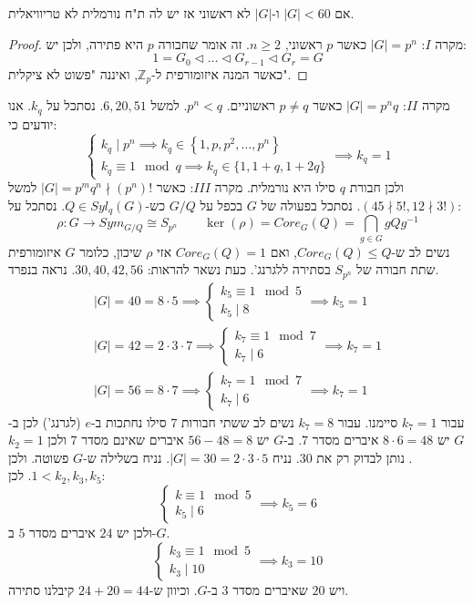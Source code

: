 \documentclass{tstextbook}
\begin{document}
\begin{proposition}
אם \(|G|<60\) ו-\(|G|\) לא ראשוני אז יש לה ת"ח נורמלית לא טריוויאלית.

\end{proposition}
\begin{proof}
מקרה \(I\): \(|G|=p^n\) כאשר \(p\) ראשוני, \(n\geq 2\). זה אומר שחבורה \(p\) היא פתירה, ולכן יש:
$$1=G_{0}\triangleleft \dots \triangleleft G_{r-1}\triangleleft G_{r}=G$$
כאשר המנה איזומורפית ל-\(\mathbb{Z} _p\), ואיננה "פשוט לא ציקלית".

\end{proof}
מקרה \(II\): \(|G|=p^nq\) כאשר \(p\neq q\) ראשוניים. \(p^n<q\). למשל \(6,20,51\). נסתכל על \(k_{q}\). אנו יודעים כי: 
$$\begin{cases}k_{q}\mid p^n\implies k_{q}\in \left\{  1,p,p^2,\dots,p^n  \right\} \\k_{q}\equiv 1\mod q \implies k_{q}\in \{1, 1+q, 1+2q  \}
\end{cases}\implies k_{q}=1$$
ולכן חבורת \(q\) סילו היא נורמלית.
מקרה \(III\): כאשר \(|G|=p^mq^n \nmid(p^n)!\) למשל \(\left( 45\nmid 5!, 12\nmid 3! \right)\). נסתכל בפעולה של \(G\) בכפל על \(G / Q\) כש-\(Q\in Syl_{q}(G)\). נסתכל על:
$$\rho:G\to Sym_{G / Q}\cong S_{p^n}\qquad \ker\left( \rho \right)=Core_{G}(Q)=\bigcap_{g\in G}gQg^{-1}$$
נשים לב ש-\(Core_{G}(Q)\leq Q\), ואם \(Core_{G}(Q)=1\) אזי \(\rho\) שיכון, כלומר \(G\) איזומורפית שתת חבורה של \(S_{p^n}\) בסתירה ללגרנג'.
כעת נשאר להראות: \(30,40,42,56\). נראה בנפרד.
$$\begin{gather}|G|=40=8\cdot 5\implies \begin{cases}k_{5}\equiv 1 \mod 5\\k_{5}\mid 8\end{cases}\implies k_{5}=1\\|G|=42=2\cdot 3\cdot 7\implies \begin{cases}k_{7} \equiv 1 \mod 7 \\k_{7} \mid 6\end{cases}\implies k_{7}=1\\|G|=56=8\cdot 7\implies \begin{cases}k_{7}=1 \mod 7 \\k_{7} \mid 6\end{cases}\implies k_{7}=1 
\end{gather}$$
עבור \(k_{7}=1\) סיימנו. עבור \(k_{7}=8\) נשים לב ששתי חבורות \(7\) סילו נחתכות ב-\(e\) (לגרנג') לכן ב-\(G\) יש \(8\cdot 6=48\) איברים מסדר \(7\). ב-\(G\) יש \(56-48=8\) איברים שאינם מסדר \(7\) ולכן \(k_{2}=1\). נותן לבדוק רק את \(30\). נניח \(|G|=30=2\cdot 3\cdot 5\). נניח בשלילה ש-\(G\) פשוטה. ולכן \(1<k_{2},k_{3},k_{5}\). לכן: 
$$\begin{cases}k \equiv 1 \mod 5 \\k_{5} \mid 6
\end{cases}\implies k_{5}=6$$
ולכן יש \(24\) איברים מסדר \(5\) ב-\(G\).
$$\begin{cases}  k_{3} \equiv 1 \mod 5\\k_{3}\mid 10  
\end{cases}\implies k_{3}=10$$
ויש \(20\) שאיברים מסדר \(3\) ב-\(G\). וכיוון ש-\(24+20=44\) קיבלנו סתירה.
\end{document}
